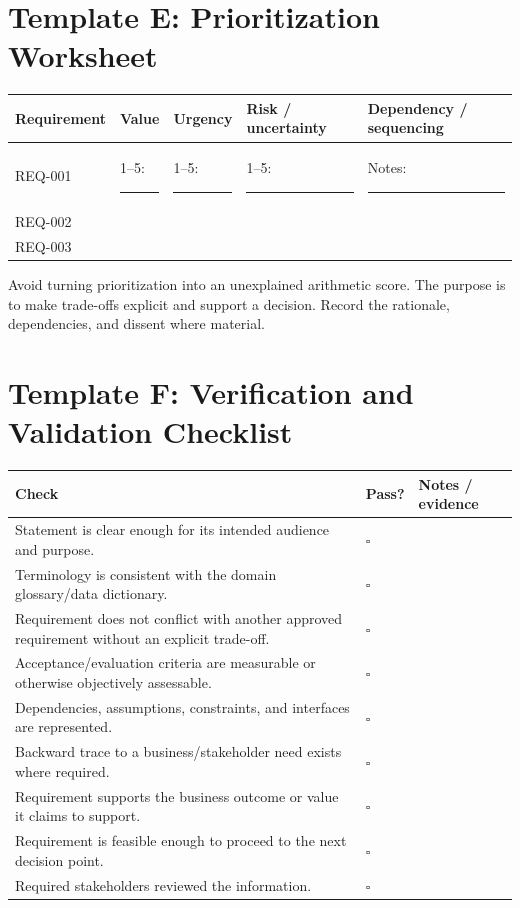 \documentclass[11pt]{article}
\begin{document}
\section{Template E: Prioritization Worksheet}
\begin{longtable}{L{0.22\textwidth} L{0.14\textwidth} L{0.14\textwidth} L{0.14\textwidth} L{0.14\textwidth}}
\toprule
Requirement & Value & Urgency & Risk / uncertainty & Dependency / sequencing\\
\midrule
REQ-001 & 1--5: \rule{0.25in}{0.4pt} & 1--5: \rule{0.25in}{0.4pt} & 1--5: \rule{0.25in}{0.4pt} & Notes: \rule{0.7in}{0.4pt}\\
REQ-002 & & & & \\
REQ-003 & & & & \\
\bottomrule
\end{longtable}
\begin{warningbox}
Avoid turning prioritization into an unexplained arithmetic score. The purpose is to make trade-offs explicit and support a decision. Record the rationale, dependencies, and dissent where material.
\end{warningbox}
\section{Template F: Verification and Validation Checklist}
\begin{longtable}{L{0.48\textwidth} L{0.10\textwidth} L{0.30\textwidth}}
\toprule
Check & Pass? & Notes / evidence\\
\midrule
Statement is clear enough for its intended audience and purpose. & $\square$ & \\
Terminology is consistent with the domain glossary/data dictionary. & $\square$ & \\
Requirement does not conflict with another approved requirement without an explicit trade-off. & $\square$ & \\
Acceptance/evaluation criteria are measurable or otherwise objectively assessable. & $\square$ & \\
Dependencies, assumptions, constraints, and interfaces are represented. & $\square$ & \\
Backward trace to a business/stakeholder need exists where required. & $\square$ & \\
Requirement supports the business outcome or value it claims to support. & $\square$ & \\
Requirement is feasible enough to proceed to the next decision point. & $\square$ & \\
Required stakeholders reviewed the information. & $\square$ & \\
\bottomrule
\end{longtable}
\end{document}
